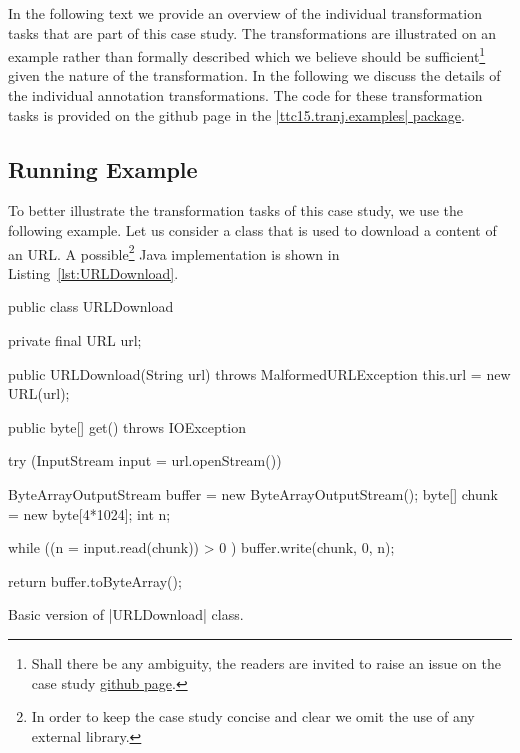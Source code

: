 In the following text we provide an overview of the individual transformation tasks that are part of this case study.
The transformations are illustrated on an example rather than formally described which we believe should be sufficient\footnote{Shall there be any ambiguity, the readers are invited to raise an issue on the case study \href{https://github.com/fikovnik/ttc15-live-contest}{github page}.} given the nature of the transformation.
In the following we discuss the details of the individual annotation transformations.
%
The code for these transformation tasks is provided on the github page in the \href{https://github.com/fikovnik/ttc15-live-contest/tree/master/src/ttc15-tranj/src/main/java/ttc15/tranj/examples}{\javainline|ttc15.tranj.examples| package}.

\subsection{Running Example}

To better illustrate the transformation tasks of this case study, we use the following example.
Let us consider a class that is used to download a content of an URL.
A possible\footnote{In order to keep the case study concise and clear we omit the use of any external library.} Java implementation is shown in Listing~\ref{lst:URLDownload}.

\begin{listing}[H]
  \begin{javacode}
  public class URLDownload {
    private final URL url;

    public URLDownload(String url) throws MalformedURLException {
      this.url = new URL(url);
    }

    public byte[] get() throws IOException {
      try (InputStream input = url.openStream()) {

        ByteArrayOutputStream buffer = new ByteArrayOutputStream();
        byte[] chunk = new byte[4*1024];
        int n;

        while ((n = input.read(chunk)) > 0 ) {
          buffer.write(chunk, 0, n);
        }

        return buffer.toByteArray();
      }
    }
  }
  \end{javacode}
  \caption{Basic version of \javainline|URLDownload| class.}
  \label{lst:URLDownload}
\end{listing}

